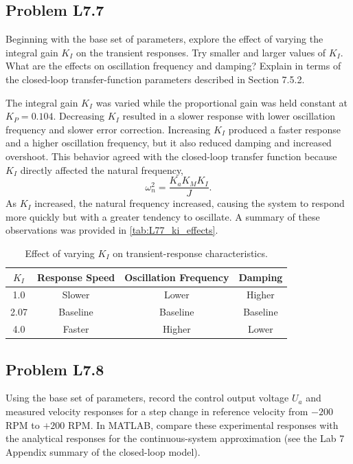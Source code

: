 \documentclass[10pt,twocolumn]{article}
\begin{document}
\subsection{Problem L7.7}
Beginning with the base set of parameters, explore the effect of varying the integral gain $K_I$ on the transient responses. Try smaller and larger values of $K_I$. What are the effects on oscillation frequency and damping? Explain in terms of the closed-loop transfer-function parameters described in Section 7.5.2.


The integral gain $K_I$ was varied while the proportional gain was held constant at $K_P = 0.104$. Decreasing $K_I$ resulted in a slower response with lower oscillation frequency and slower error correction. Increasing $K_I$ produced a faster response and a higher oscillation frequency, but it also reduced damping and increased overshoot. This behavior agreed with the closed-loop transfer function because $K_I$ directly affected the natural frequency,
\begin{equation}
\omega_n^2 = \frac{K_a K_M K_I}{J}.
\end{equation}
As $K_I$ increased, the natural frequency increased, causing the system to respond more quickly but with a greater tendency to oscillate. A summary of these observations was provided in \autoref{tab:L77_ki_effects}.

\begin{table}[htb]
\centering
\begin{tabular}{c c c c}
\hline
$K_I$ & Response Speed & Oscillation Frequency & Damping \\
\hline
1.0 & Slower & Lower & Higher \\
2.07 & Baseline & Baseline & Baseline \\
4.0 & Faster & Higher & Lower \\
\hline
\end{tabular}
\caption{Effect of varying $K_I$ on transient-response characteristics.}
\label{tab:L77_ki_effects}
\end{table}

\subsection{Problem L7.8}
Using the base set of parameters, record the control output voltage $U_a$ and measured velocity responses for a step change in reference velocity from $-200$ RPM to $+200$ RPM. In MATLAB, compare these experimental responses with the analytical responses for the continuous-system approximation (see the Lab 7 Appendix summary of the closed-loop model).
\end{document}

